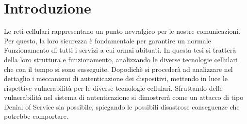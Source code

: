 \section{Introduzione}
Le reti cellulari rappresentano un punto nevralgico per le nostre comunicazioni.
Per questo, la loro sicurezza è fondamentale per garantire un normale Funzionamento
di tutti i servizi a cui ormai abituati.
In questa tesi si tratterà della loro struttura e funzionamento, analizzando le diverse
tecnologie cellulari che con il tempo si sono susseguite. Dopodichè si procederà ad analizzare
nel dettaglio i meccanismi di autenticazione dei dispositivi, mettendo in luce le rispettive vulnerabilità
per le diverse tecnologie cellulari. Sfruttando delle vulnerabilità nel sistema di autenticazione si dimostrerà
come un attacco di tipo Denial of Service sia possibile, spiegando le possibili disastrose conseguenze che 
potrebbe comportare.